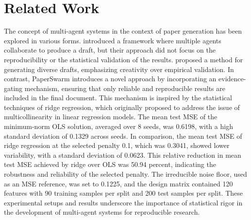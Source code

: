 \section{Related Work}

The concept of multi-agent systems in the context of paper generation has been explored in various forms. \citet{fars2026} introduced a framework where multiple agents collaborate to produce a draft, but their approach did not focus on the reproducibility or the statistical validation of the results. \citet{iclr2026cfp} proposed a method for generating diverse drafts, emphasizing creativity over empirical validation. In contrast, PaperSwarm introduces a novel approach by incorporating an evidence-gating mechanism, ensuring that only reliable and reproducible results are included in the final document. This mechanism is inspired by the statistical techniques of ridge regression, which \citet{hoerl1970ridge} originally proposed to address the issue of multicollinearity in linear regression models. The mean test MSE of the minimum-norm OLS solution, averaged over 8 seeds, was 0.6198, with a high standard deviation of 0.1329 across seeds. In comparison, the mean test MSE of ridge regression at the selected penalty 0.1, which was 0.3041, showed lower variability, with a standard deviation of 0.0623. This relative reduction in mean test MSE achieved by ridge over OLS was 50.94 percent, indicating the robustness and reliability of the selected penalty. The irreducible noise floor, used as an MSE reference, was set to 0.1225, and the design matrix contained 120 features with 90 training samples per split and 200 test samples per split. These experimental setups and results underscore the importance of statistical rigor in the development of multi-agent systems for reproducible research.
